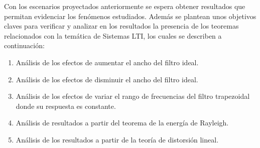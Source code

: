 Con los escenarios proyectados anteriormente se espera obtener resultados que permitan evidenciar los fenómenos estudiados. Además se plantean unos objetivos claves para verificar y analizar en los resultados la presencia de los teoremas relacionados con la temática de Sistemas LTI, los cuales se describen a continuación:

\begin{enumerate}
	\item Análisis de los efectos de aumentar el ancho del filtro ideal.
	\item Análisis de los efectos de disminuir el ancho del filtro ideal.
	\item Análisis de los efectos de variar el rango de frecuencias del filtro trapezoidal donde su respuesta es constante.
	\item Análisis de resultados a partir del teorema de la energía de Rayleigh.
	\item Análisis de los resultados a partir de la teoría de distorsión lineal.
\end{enumerate}
